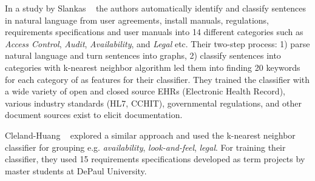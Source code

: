 	In a study by Slankas \etal~\cite{Slankas:2013} the authors automatically
identify and classify sentences in natural language from user agreements, install
manuals, regulations, requirements specifications and user manuals into 14
different \NFR categories such as \emph{Access Control}, \emph{Audit}, \emph{Availability},  and \emph{Legal} etc.
Their two-step process: 1) parse natural language and turn sentences into graphs, 2) classify sentences into categories with k-nearest neighbor algorithm led them
into finding 20 keywords for each category of \NFR as features for their
classifier. They trained the \NFR classifier
with a wide variety of open and closed source EHRs (Electronic Health Record),
various industry standards (HL7, CCHIT), governmental regulations, and other
document sources exist to elicit documentation.

 	Cleland-Huang \etal~\cite{Cleland-Huang2007} explored a similar approach and
used the k-nearest neighbor classifier for grouping \NFR e.g.
\emph{availability}, \emph{look-and-feel}, \emph{legal}. For training their classifier, they used 15 requirements specifications developed as term projects by master students at DePaul University.
